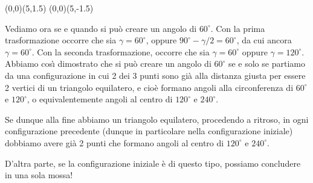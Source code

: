{\begin{center}
{	
	\endpspicture
	}
	\pcline[nodesep=1.7\psunit]{->}(0,0)(5,1.5)
	\pcline[nodesep=1.7\psunit]{->}(0,0)(5,-1.5)
	\endpspicture
\end{center}
Vediamo ora se e quando si può creare un angolo di $60^{\circ}$. Con la prima trasformazione occorre che sia $\gamma=60^{\circ}$, oppure $90^{\circ}-\gamma/2=60^{\circ}$, da cui ancora $\gamma=60^{\circ}$.  Con la seconda trasformazione, occorre che sia
$\gamma=60^{\circ}$ oppure $\gamma=120^{\circ}$. Abbiamo cos\`{\i}
dimostrato che si può creare un angolo di $60^{\circ}$ se e solo se partiamo da una configurazione in cui 2 dei 3 punti sono già alla distanza giusta per essere 2 vertici di un triangolo equilatero, e cioè formano angoli alla circonferenza di $60^{\circ}$ e $120^{\circ}$, o equivalentemente angoli al centro di $120^{\circ}$ e $240^{\circ}$.

Se dunque alla fine abbiamo un triangolo equilatero, procedendo a ritroso, in ogni configurazione precedente (dunque in particolare nella configurazione iniziale) dobbiamo avere già 2 punti che formano angoli al centro di $120^{\circ}$ e $240^{\circ}$.

D'altra parte, se la configurazione iniziale è di questo tipo,
possiamo concludere in una sola mossa!}

\renewcommand{\SoluzioniAlternative}{
}

\renewcommand{\Osservazioni}{
}

\renewcommand{\Commenti}{
}
